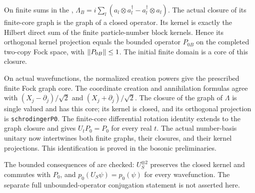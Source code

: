 \begin{definition}\label{def:P0B}
  \leanok
  \par
  On finite sums in the ,
  $\Lambda_B=i\sum_l(a_l\otimes a_l^\dagger-a_l^\dagger\otimes a_l)$.
  The actual closure of its finite-core graph is the graph of a closed
  operator. Its kernel is exactly the Hilbert direct sum of the finite particle-number
  block kernels. Hence its orthogonal kernel projection equals the bounded
  operator $P_{0B}$ on the completed two-copy Fock space, with
  $\lVert P_{0B} \rVert\le1$. The initial finite domain is a core of this closure.

  On actual wavefunctions, the normalized creation powers give the prescribed
  finite Fock graph core. The coordinate creation and annihilation formulas
  agree with $(X_j-\partial_j)/\sqrt2$ and $(X_j+\partial_j)/\sqrt2$.
  The closure of the graph of $\Lambda$ is single valued and has this core;
  its kernel is closed, and its orthogonal projection is
  \texttt{schrodingerP0}. The finite-core differential rotation identity
  extends to the graph closure and gives $U_tP_0=P_0$ for every real $t$.
  The actual number-basis unitary now intertwines both finite graphs, their
  closures, and their kernel projections. This identification is proved in
  the bosonic preliminaries.

  The bounded consequences of 
  are checked: $U_S^{\otimes2}$ preserves the closed kernel and commutes with
  $P_0$, and $p_0(U_S\psi)=p_0(\psi)$ for every wavefunction. The separate
  full unbounded-operator conjugation statement is not asserted here.
\end{definition}

